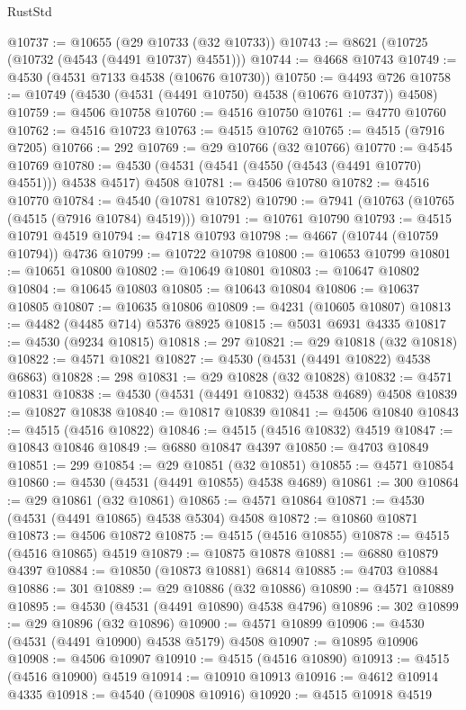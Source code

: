 \begin{lexlean}{RustStd}
\begin{coremodule}
{\begin{coremodule}
{{{{{{{{{{{{{{{{{{{{{{{{{{{{{{{{{{{{{{{{{{{{{{{{{{{{{{{@10737 := @10655 (@29 @10733 (@32 @10733))
@10743 := @8621 (@10725 (@10732 (@4543 (@4491 @10737) @4551)))
@10744 := @4668 @10743
@10749 := @4530 (@4531 @7133 @4538 (@10676 @10730))
@10750 := @4493 @726
@10758 := @10749 (@4530 (@4531 (@4491 @10750) @4538 (@10676 @10737)) @4508)
@10759 := @4506 @10758
@10760 := @4516 @10750
@10761 := @4770 @10760
@10762 := @4516 @10723
@10763 := @4515 @10762
@10765 := @4515 (@7916 @7205)
@10766 := 292
@10769 := @29 @10766 (@32 @10766)
@10770 := @4545 @10769
@10780 := @4530 (@4531 (@4541 (@4550 (@4543 (@4491 @10770) @4551))) @4538 @4517) @4508
@10781 := @4506 @10780
@10782 := @4516 @10770
@10784 := @4540 (@10781 @10782)
@10790 := @7941 (@10763 (@10765 (@4515 (@7916 @10784) @4519)))
@10791 := @10761 @10790
@10793 := @4515 @10791 @4519
@10794 := @4718 @10793
@10798 := @4667 (@10744 (@10759 @10794)) @4736
@10799 := @10722 @10798
@10800 := @10653 @10799
@10801 := @10651 @10800
@10802 := @10649 @10801
@10803 := @10647 @10802
@10804 := @10645 @10803
@10805 := @10643 @10804
@10806 := @10637 @10805
@10807 := @10635 @10806
@10809 := @4231 (@10605 @10807)
@10813 := @4482 (@4485 @714) @5376 @8925
@10815 := @5031 @6931 @4335
@10817 := @4530 (@9234 @10815)
@10818 := 297
@10821 := @29 @10818 (@32 @10818)
@10822 := @4571 @10821
@10827 := @4530 (@4531 (@4491 @10822) @4538 @6863)
@10828 := 298
@10831 := @29 @10828 (@32 @10828)
@10832 := @4571 @10831
@10838 := @4530 (@4531 (@4491 @10832) @4538 @4689) @4508
@10839 := @10827 @10838
@10840 := @10817 @10839
@10841 := @4506 @10840
@10843 := @4515 (@4516 @10822)
@10846 := @4515 (@4516 @10832) @4519
@10847 := @10843 @10846
@10849 := @6880 @10847 @4397
@10850 := @4703 @10849
@10851 := 299
@10854 := @29 @10851 (@32 @10851)
@10855 := @4571 @10854
@10860 := @4530 (@4531 (@4491 @10855) @4538 @4689)
@10861 := 300
@10864 := @29 @10861 (@32 @10861)
@10865 := @4571 @10864
@10871 := @4530 (@4531 (@4491 @10865) @4538 @5304) @4508
@10872 := @10860 @10871
@10873 := @4506 @10872
@10875 := @4515 (@4516 @10855)
@10878 := @4515 (@4516 @10865) @4519
@10879 := @10875 @10878
@10881 := @6880 @10879 @4397
@10884 := @10850 (@10873 @10881) @6814
@10885 := @4703 @10884
@10886 := 301
@10889 := @29 @10886 (@32 @10886)
@10890 := @4571 @10889
@10895 := @4530 (@4531 (@4491 @10890) @4538 @4796)
@10896 := 302
@10899 := @29 @10896 (@32 @10896)
@10900 := @4571 @10899
@10906 := @4530 (@4531 (@4491 @10900) @4538 @5179) @4508
@10907 := @10895 @10906
@10908 := @4506 @10907
@10910 := @4515 (@4516 @10890)
@10913 := @4515 (@4516 @10900) @4519
@10914 := @10910 @10913
@10916 := @4612 @10914 @4335
@10918 := @4540 (@10908 @10916)
@10920 := @4515 @10918 @4519
}}}}}}}}}}}}}}}}}}}}}}}}}}}}}}}}}}}}}}}}}}}}}}}}}}}}}}}
\end{coremodule}}
\end{coremodule}
\end{lexlean}
